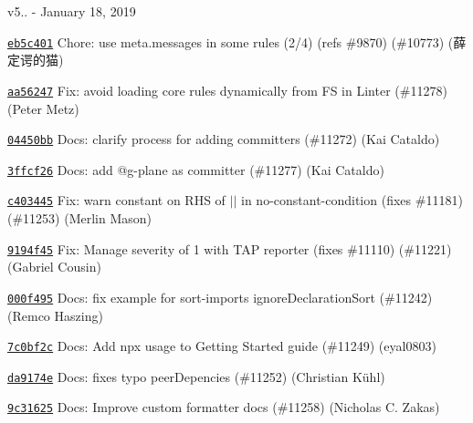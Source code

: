 v5.. -\/ January 18, 2019


\begin{DoxyItemize}
\item \href{https://github.com/eslint/eslint/commit/eb5c4014f16be1c2003ed46ce9560d0d8a567d0f}{\texttt{ {\ttfamily eb5c401}}} Chore\+: use meta.\+messages in some rules (2/4) (refs \#9870) (\#10773) (薛定谔的猫)
\item \href{https://github.com/eslint/eslint/commit/aa56247746a0095996a41dd03bdbbf659f0f93b6}{\texttt{ {\ttfamily aa56247}}} Fix\+: avoid loading core rules dynamically from FS in Linter (\#11278) (Peter Metz)
\item \href{https://github.com/eslint/eslint/commit/04450bb7ed20f2412102538b238119d9764b4dc9}{\texttt{ {\ttfamily 04450bb}}} Docs\+: clarify process for adding committers (\#11272) (Kai Cataldo)
\item \href{https://github.com/eslint/eslint/commit/3ffcf26c1c83efe7d7cf2d87f1063695ae653709}{\texttt{ {\ttfamily 3ffcf26}}} Docs\+: add @g-\/plane as committer (\#11277) (Kai Cataldo)
\item \href{https://github.com/eslint/eslint/commit/c40344566eff2e77a6ae2b2d2dbdbd4ad3e76b67}{\texttt{ {\ttfamily c403445}}} Fix\+: warn constant on R\+HS of $\vert$$\vert$ in no-\/constant-\/condition (fixes \#11181) (\#11253) (Merlin Mason)
\item \href{https://github.com/eslint/eslint/commit/9194f45ac7d521119a53773bf02b81670bad526e}{\texttt{ {\ttfamily 9194f45}}} Fix\+: Manage severity of 1 with T\+AP reporter (fixes \#11110) (\#11221) (Gabriel Cousin)
\item \href{https://github.com/eslint/eslint/commit/000f4952ae6a4311fbbc3ed36c481235fcb0b64b}{\texttt{ {\ttfamily 000f495}}} Docs\+: fix example for sort-\/imports ignore\+Declaration\+Sort (\#11242) (Remco Haszing)
\item \href{https://github.com/eslint/eslint/commit/7c0bf2ca92d83125a1fa000c9c4250bae6b4fc21}{\texttt{ {\ttfamily 7c0bf2c}}} Docs\+: Add {\ttfamily npx} usage to Getting Started guide (\#11249) (eyal0803)
\item \href{https://github.com/eslint/eslint/commit/da9174e0798c1d785ddabb3ae405860fc5b89311}{\texttt{ {\ttfamily da9174e}}} Docs\+: fixes typo peer\+Depencies (\#11252) (Christian Kühl)
\item \href{https://github.com/eslint/eslint/commit/9c31625f19176664ef76dcf088ce50703c41c324}{\texttt{ {\ttfamily 9c31625}}} Docs\+: Improve custom formatter docs (\#11258) (Nicholas C. Zakas)
\end{DoxyItemize}

